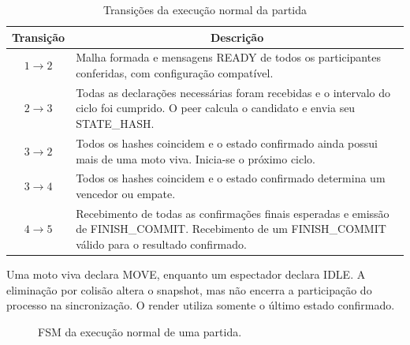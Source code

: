 \documentclass[11pt,a4paper]{article}
\begin{document}
\begin{table}[H]
    \centering
    \caption{Transições da execução normal da partida}
    \label{tab:fsm_partida_transicoes}
    \begin{tabular}{|c|p{11.7cm}|}
        \hline
        \textbf{Transição} &
        \multicolumn{1}{c|}{\textbf{Descrição}} \\ \hline

        $1 \rightarrow 2$ &
        Malha formada e mensagens READY de todos os participantes conferidas, com configuração compatível. \\ \hline

        $2 \rightarrow 3$ &
        Todas as declarações necessárias foram recebidas e o intervalo do ciclo foi cumprido. O peer calcula o candidato e envia seu STATE\_HASH. \\ \hline

        $3 \rightarrow 2$ &
        Todos os hashes coincidem e o estado confirmado ainda possui mais de uma moto viva. Inicia-se o próximo ciclo. \\ \hline

        $3 \rightarrow 4$ &
        Todos os hashes coincidem e o estado confirmado determina um vencedor ou empate. \\ \hline

        $4 \rightarrow 5$ &
        Recebimento de todas as confirmações finais esperadas e emissão de FINISH\_COMMIT.
        \newline
        Recebimento de um FINISH\_COMMIT válido para o resultado confirmado. \\ \hline
    \end{tabular}
\end{table}

Uma moto viva declara MOVE, enquanto um espectador declara IDLE. A eliminação por colisão altera o snapshot, mas não encerra a participação do processo na sincronização. O render utiliza somente o último estado confirmado.

\begin{figure}[H]
    \centering
    \caption{FSM da execução normal de uma partida.}
    \label{fig:fsm_partida}
\end{figure}
\end{document}
